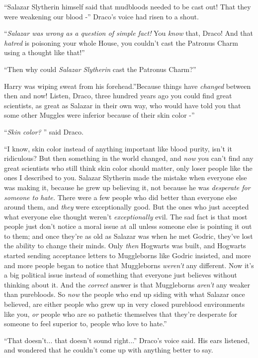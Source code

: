 ``Salazar Slytherin himself said that mudbloods needed to be cast out!
That they were weakening our blood -'' Draco's voice had risen to a
shout.

``\emph{Salazar was wrong as a question of simple fact!} You \emph{know}
that, Draco! And that \emph{hatred} is poisoning your whole House, you
couldn't cast the Patronus Charm using a thought like that!''

``Then why could \emph{Salazar Slytherin} cast the Patronus Charm?''

Harry was wiping sweat from his forehead.''Because things have
\emph{changed} between then and now! Listen, Draco, three hundred years
ago you could find great scientists, as great as Salazar in their own
way, who would have told you that some other Muggles were inferior
because of their skin color -''

``\emph{Skin color?} '' said Draco.

``I know, skin color instead of anything important like blood purity,
isn't it ridiculous? But then something in the world changed, and
\emph{now} you can't find any great scientists who still think skin
color should matter, only loser people like the ones I described to you.
Salazar Slytherin made the mistake when everyone else was making it,
because he grew up believing it, not because he was \emph{desperate for
someone to hate.} There were a few people who did better than everyone
else around them, and \emph{they} were exceptionally good. But the ones
who just accepted what everyone else thought weren't
\emph{exceptionally} evil. The sad fact is that most people just don't
notice a moral issue at all unless someone else is pointing it out to
them; and once they're as old as Salazar was when he met Godric, they've
lost the ability to change their minds. Only \emph{then} Hogwarts was
built, and Hogwarts started sending acceptance letters to Muggleborns
like Godric insisted, and more and more people began to notice that
Muggleborns \emph{weren't} any different. Now it's a big political issue
instead of something that everyone just believes without thinking about
it. And the \emph{correct} answer is that Muggleborns \emph{aren't} any
weaker than purebloods. So \emph{now} the people who end up siding with
what Salazar once believed, are either people who grew up in very closed
pureblood environments like you, \emph{or} people who are so pathetic
themselves that they're desperate for someone to feel superior to,
people who love to hate.''

``That doesn't... that doesn't sound right...'' Draco's voice
said. His ears listened, and wondered that he couldn't come up with
anything better to say.

